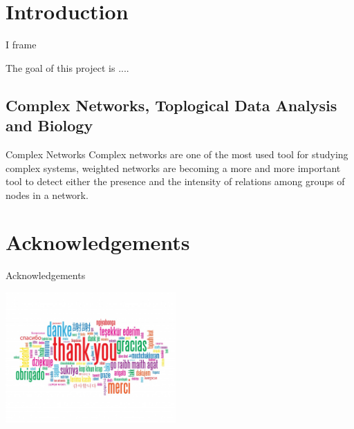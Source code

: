 \documentclass[xcolor=x11names,compress]{beamer}
\theoremstyle{definition} \newtheorem{esempio}{Esempio}
\theoremstyle{definition}
\begin{document}
\section{Introduction}
\begin{frame}{I frame}


\begin{minipage}[c]{0.65\textwidth}
The goal of this project is ....
\end{minipage}
\begin{minipage}[c]{0.25\textwidth}
\end{minipage}



\end{frame}
\subsection{Complex Networks, Toplogical Data Analysis and Biology}
\begin{frame}{Complex Networks}
Complex networks are one of the most used tool for studying complex systems, weighted networks are becoming a more and more important tool to detect either the presence and the intensity of relations among groups of nodes in a network.

\centering{
}

\end{frame}


\section*{Acknowledgements}
\begin{frame}{Acknowledgements}
\begin{center}
\includegraphics[width=6.5cm]{./immagini/thanks}
\end{center}
\end{frame}

\end{document}
